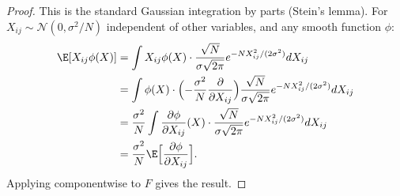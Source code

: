 \begin{proof}
This is the standard Gaussian integration by parts (Stein's lemma). For $X_{ij} \sim \mathcal{N}(0, \sigma^2/N)$ independent of other variables, and any smooth function $\phi$:
\begin{align}
\E[X_{ij} \phi(X)]
&= \int X_{ij} \phi(X) \cdot \frac{\sqrt{N}}{\sigma\sqrt{2\pi}} e^{-N X_{ij}^2/(2\sigma^2)} dX_{ij} \\
&= \int \phi(X) \cdot \Bigl(-\frac{\sigma^2}{N} \frac{\partial}{\partial X_{ij}}\Bigr) \frac{\sqrt{N}}{\sigma\sqrt{2\pi}} e^{-NX_{ij}^2/(2\sigma^2)} dX_{ij} \\
&= \frac{\sigma^2}{N} \int \frac{\partial \phi}{\partial X_{ij}}(X) \cdot \frac{\sqrt{N}}{\sigma\sqrt{2\pi}} e^{-NX_{ij}^2/(2\sigma^2)} dX_{ij} \\
&= \frac{\sigma^2}{N} \E\Bigl[\frac{\partial \phi}{\partial X_{ij}}\Bigr].
\end{align}
Applying componentwise to $F$ gives the result.
\end{proof}

